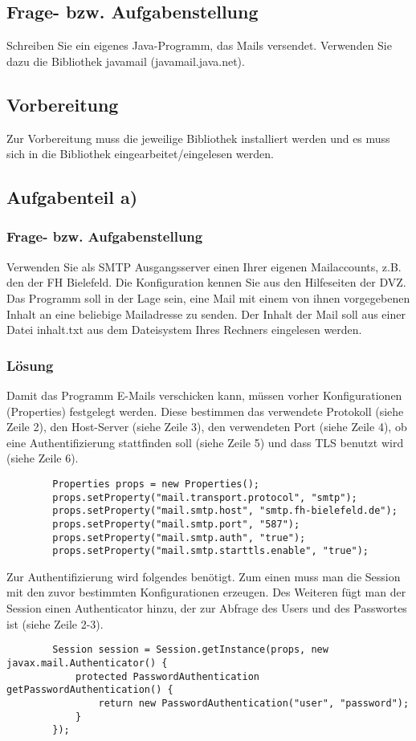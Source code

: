 \subsection{Frage- bzw. Aufgabenstellung}
Schreiben Sie ein eigenes Java-Programm, das Mails versendet. Verwenden Sie dazu die Bibliothek javamail (javamail.java.net). 

\subsection{Vorbereitung}
Zur Vorbereitung muss die jeweilige Bibliothek installiert werden und es muss sich in die Bibliothek eingearbeitet/eingelesen werden.

\subsection{Aufgabenteil a)}
\subsubsection{Frage- bzw. Aufgabenstellung}

Verwenden Sie als SMTP Ausgangsserver einen Ihrer eigenen Mailaccounts, z.B. den der FH Bielefeld. Die Konfiguration kennen Sie aus den Hilfeseiten der DVZ. Das Programm soll in der Lage sein, eine Mail mit einem von ihnen vorgegebenen Inhalt an eine beliebige Mailadresse zu senden. Der Inhalt der Mail soll aus einer Datei inhalt.txt aus dem Dateisystem Ihres Rechners eingelesen werden.

\subsubsection{Lösung}
Damit das Programm E-Mails verschicken kann, müssen vorher Konfigurationen (Properties) festgelegt werden. Diese bestimmen das verwendete Protokoll (siehe Zeile 2), den Host-Server (siehe Zeile 3), den verwendeten Port (siehe Zeile 4), ob eine Authentifizierung stattfinden soll (siehe Zeile 5) und dass TLS benutzt wird (siehe Zeile 6). \cite{[5,4]}
\begin{lstlisting}
		Properties props = new Properties();
		props.setProperty("mail.transport.protocol", "smtp");
		props.setProperty("mail.smtp.host", "smtp.fh-bielefeld.de");
		props.setProperty("mail.smtp.port", "587");
		props.setProperty("mail.smtp.auth", "true");
		props.setProperty("mail.smtp.starttls.enable", "true");
\end{lstlisting}


Zur Authentifizierung wird folgendes benötigt. Zum einen muss man die Session mit den zuvor bestimmten Konfigurationen erzeugen. Des Weiteren fügt man der Session einen Authenticator hinzu, der zur Abfrage des Users und des Passwortes ist (siehe Zeile 2-3). \cite{[6]}
\begin{lstlisting}
		Session session = Session.getInstance(props, new javax.mail.Authenticator() {
			protected PasswordAuthentication getPasswordAuthentication() {
				return new PasswordAuthentication("user", "password");
			}
		});
\end{lstlisting}


